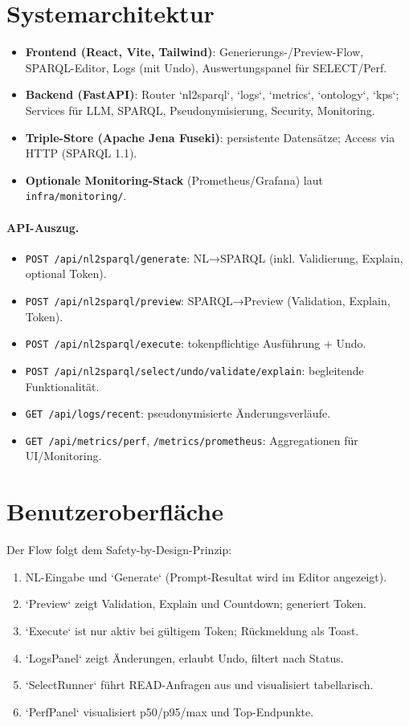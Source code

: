 \section{Systemarchitektur}
\label{subsec:arch-backend}
\begin{itemize}
  \item \textbf{Frontend (React, Vite, Tailwind)}: Generierungs-/Preview-Flow, SPARQL-Editor, Logs (mit Undo), Auswertungspanel für SELECT/Perf.
  \item \textbf{Backend (FastAPI)}: Router `nl2sparql`, `logs`, `metrics`, `ontology`, `kps`; Services für LLM, SPARQL, Pseudonymisierung, Security, Monitoring.
  \item \textbf{Triple-Store (Apache Jena Fuseki)}: persistente Datensätze; Access via HTTP (SPARQL 1.1).
  \item \textbf{Optionale Monitoring-Stack} (Prometheus/Grafana) laut \texttt{infra/monitoring/}.
\end{itemize}

\paragraph{API-Auszug.}
\begin{itemize}
  \item \texttt{POST /api/nl2sparql/generate}: NL→SPARQL (inkl. Validierung, Explain, optional Token).
  \item \texttt{POST /api/nl2sparql/preview}: SPARQL→Preview (Validation, Explain, Token).
  \item \texttt{POST /api/nl2sparql/execute}: tokenpflichtige Ausführung + Undo.
  \item \texttt{POST /api/nl2sparql/select/undo/validate/explain}: begleitende Funktionalität.
  \item \texttt{GET /api/logs/recent}: pseudonymisierte Änderungsverläufe.
  \item \texttt{GET /api/metrics/perf}, \texttt{/metrics/prometheus}: Aggregationen für UI/Monitoring.
\end{itemize}

\section{Benutzeroberfläche}
Der Flow folgt dem Safety-by-Design-Prinzip:
\begin{enumerate}
  \item NL-Eingabe und `Generate` (Prompt-Resultat wird im Editor angezeigt).
  \item `Preview` zeigt Validation, Explain und Countdown; generiert Token.
  \item `Execute` ist nur aktiv bei gültigem Token; Rückmeldung als Toast.
  \item `LogsPanel` zeigt Änderungen, erlaubt Undo, filtert nach Status.
  \item `SelectRunner` führt READ-Anfragen aus und visualisiert tabellarisch.
  \item `PerfPanel` visualisiert p50/p95/max und Top-Endpunkte.
\end{enumerate}

